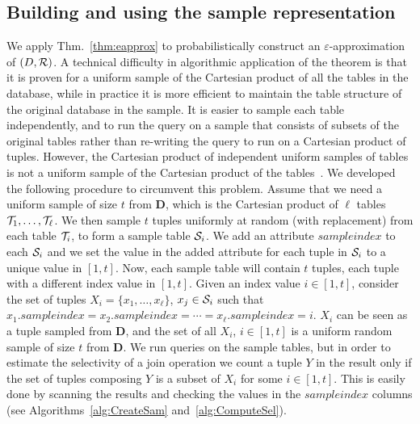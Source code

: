 \subsection{Building and using the sample representation}\label{sec:vcfreqbuilding}
We apply Thm.~\ref{thm:eapprox} to probabilistically construct an
$\varepsilon$-approximation of $(D,\mathcal{R})$.
A technical difficulty in algorithmic application of the theorem is that it is proven  for
a uniform sample of the Cartesian product
of all the tables in the database, while
in practice it is more efficient to maintain the table structure of the
original database in the sample. It is easier to sample each table
independently, and to run the query on a sample that consists of subsets of the
original tables rather than re-writing the query to run on a Cartesian product
of tuples. However, the Cartesian product of independent uniform samples of
tables is not a uniform sample of the Cartesian product of the
tables~\citep{ChaudhuriMN99}. We developed the following procedure to circumvent
this problem. Assume that we need a uniform sample of size $t$ from
$\mathbf{D}$, which is the Cartesian product of $\ell$ tables
${\cal T}_1,\dotsc,{\cal T}_\ell$. We then sample $t$ tuples uniformly at random (with
replacement) from
each table ${\cal T}_i$, to form a sample table ${\cal S}_i$. We add an attribute
$sampleindex$ to each ${\cal S}_i$ and we set the value in the added attribute for each tuple in
${\cal S}_i$ to a unique value in $[1,t]$. Now, each sample table will contain $t$ tuples,
each tuple with a different index value in $[1,t]$. Given an index value
$i\in[1,t]$, consider the set of tuples $X_i=\{x_1,\dotsc,x_\ell\}$, $x_j\in{\cal S}_i$
such that $x_1.sampleindex = x_2.sampleindex =\dotsb=x_\ell.sampleindex=i$. $X_i$
can be seen as a tuple sampled from $\mathbf{D}$, and the set of all $X_i$,
$i\in[1,t]$ is a uniform random sample of size $t$ from $\mathbf{D}$. We run
queries on the sample tables, but in order to estimate the selectivity of a join
operation we count a tuple $Y$ in the result only if the set of tuples composing
$Y$ is a subset of $X_i$ for some $i\in[1,t]$. This is easily done by scanning
the results and checking the values in the $sampleindex$ columns (see Algorithms~\ref{alg:CreateSam} and~\ref{alg:ComputeSel}).

\begin{algorithm}[ht]
\DontPrintSemicolon
{}
\caption{$\mathtt{CreateSample}(s,(T_1,\dots,T_k))$}\label{alg:CreateSam}
\end{algorithm}

